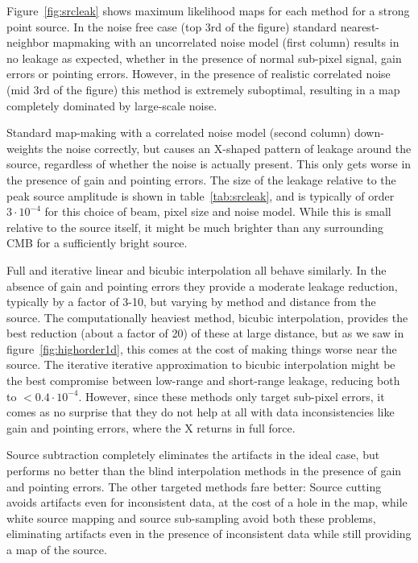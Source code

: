 \documentclass{article}
\begin{document}
Figure~\ref{fig:srcleak} shows maximum likelihood maps for each method for a strong point source.
In the noise free case (top 3rd of the figure) standard nearest-neighbor mapmaking
with an uncorrelated noise model (first column) results in no leakage as expected, whether in the
presence of normal sub-pixel signal, gain errors or pointing errors. However, in the presence
of realistic correlated noise (mid 3rd of the figure) this method is extremely suboptimal,
resulting in a map completely
dominated by large-scale noise.

Standard map-making with a correlated noise model (second column)
down-weights the noise correctly, but causes an X-shaped pattern of leakage around the
source, regardless of whether the noise is actually present. This only gets worse in
the presence of gain and pointing errors. The size of the leakage relative to
the peak source amplitude is shown in table~\ref{tab:srcleak}, and is typically of order $3\cdot 10^{-4}$ for
this choice of beam, pixel size and noise model. While
this is small relative to the source itself, it might be much brighter than any
surrounding CMB for a sufficiently bright source.

Full and iterative linear and bicubic interpolation all behave similarly.
In the absence of gain and pointing errors they provide a moderate leakage reduction,
typically by a factor of 3-10, but varying by method and distance from the source.
The computationally heaviest method, bicubic interpolation, provides the best reduction (about a factor
of 20) of these at large distance, but as we saw in figure~\ref{fig:highorder1d}, this comes at the cost of making
things worse near the source.
The iterative iterative approximation to bicubic interpolation might be the best compromise
between low-range and short-range leakage, reducing both to $<0.4 \cdot 10^{-4}$.
However, since these methods only target sub-pixel
errors, it comes as no surprise that they do not help at all with data inconsistencies
like gain and pointing errors, where the X returns in full force.

Source subtraction completely eliminates the artifacts in the ideal case, but
performs no better than the blind interpolation methods in the presence of gain
and pointing errors. The other targeted methods fare better:
Source cutting avoids artifacts even for inconsistent data, at the cost of a hole in the map,
while white source mapping and source sub-sampling avoid both these problems,
eliminating artifacts even in the presence of inconsistent data while still providing
a map of the source.
\end{document}
